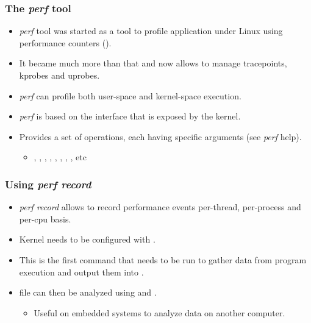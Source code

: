 \begin{frame}[fragile]
  \frametitle{The {\em perf} tool}
  \begin{itemize}
    \item {\em perf} tool was started as a tool to profile application under
          Linux using performance counters ().
    \item It became much more than that and now allows to manage tracepoints,
          kprobes and uprobes.
    \item {\em perf} can profile both user-space and kernel-space execution.
    \item {\em perf} is based on the  interface that is
          exposed by the kernel.
    \item Provides a set of operations, each having specific arguments (see
          {\em perf} help).
    \begin{itemize}
      \item {}, , , , , , , , etc
    \end{itemize}
  \end{itemize}
\end{frame}

\begin{frame}[fragile]
  \frametitle{Using {\em perf record}}
  \begin{itemize}
    \item {\em perf record} allows to record performance events per-thread,
          per-process and per-cpu basis.
    \item Kernel needs to be configured with .
    \item This is the first command that needs to be run to gather data from
          program execution and output them into .
    \item {} file can then be analyzed using 
          and .
    \begin{itemize}
      \item Useful on embedded systems to analyze data on another computer.
    \end{itemize}
  \end{itemize}
\end{frame}

